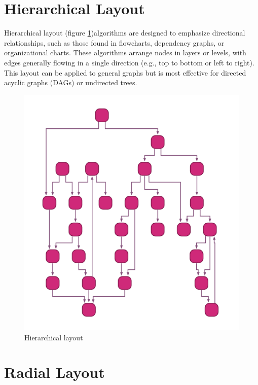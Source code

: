 \section{Hierarchical Layout}

Hierarchical layout (figure \ref{obr:graph_layout_hierarchical})algorithms are designed to emphasize directional relationships, such as those found in flowcharts,
dependency graphs, or organizational charts. These algorithms arrange nodes in layers or levels, with edges generally
flowing in a single direction (e.g., top to bottom or left to right).
This layout can be applied to general graphs but is most effective for directed acyclic graphs (DAGs) or undirected trees.

\begin{figure}[p]\centering
    \includegraphics[width=140mm, keepaspectratio]{img/graph_layout_hiearchichal.png}
    \caption{Hierarchical layout\cite{graph_layout_demos}}
    \label{obr:graph_layout_hierarchical}
\end{figure}

\section{Radial Layout}

